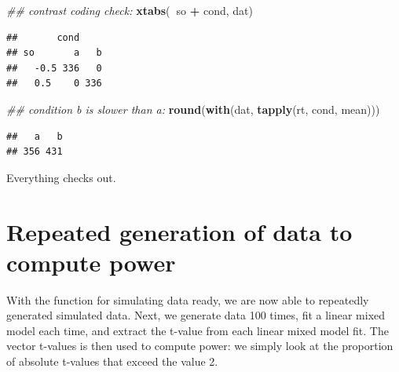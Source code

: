 \documentclass[12pt,]{krantz}
\newenvironment{Shaded}{\begin{snugshade}}{\end{snugshade}}
\newcommand{\CommentTok}[1]{\textcolor[rgb]{0.56,0.35,0.01}{\textit{#1}}}
\newcommand{\KeywordTok}[1]{\textcolor[rgb]{0.13,0.29,0.53}{\textbf{#1}}}
\newcommand{\NormalTok}[1]{#1}
\newcommand{\OperatorTok}[1]{\textcolor[rgb]{0.81,0.36,0.00}{\textbf{#1}}}
\newcommand{\StringTok}[1]{\textcolor[rgb]{0.31,0.60,0.02}{#1}}
\begin{document}
\begin{Shaded}
\begin{Highlighting}[]
\CommentTok{## contrast coding check:}
\KeywordTok{xtabs}\NormalTok{(}\OperatorTok{~}\NormalTok{so }\OperatorTok{+}\StringTok{ }\NormalTok{cond, dat)}
\end{Highlighting}
\end{Shaded}

\begin{verbatim}
##       cond
## so       a   b
##   -0.5 336   0
##   0.5    0 336
\end{verbatim}

\begin{Shaded}
\begin{Highlighting}[]
\CommentTok{## condition b is slower than a:}
\KeywordTok{round}\NormalTok{(}\KeywordTok{with}\NormalTok{(dat, }\KeywordTok{tapply}\NormalTok{(rt, cond, mean)))}
\end{Highlighting}
\end{Shaded}

\begin{verbatim}
##   a   b 
## 356 431
\end{verbatim}

Everything checks out.

\hypertarget{repeated-generation-of-data-to-compute-power}{%
\section{Repeated generation of data to compute power}\label{repeated-generation-of-data-to-compute-power}}

With the function for simulating data ready, we are now able to repeatedly generated simulated data. Next, we generate data 100 times, fit a linear mixed model each time, and extract the t-value from each linear mixed model fit. The vector t-values is then used to compute power: we simply look at the proportion of absolute t-values that exceed the value 2.
\end{document}
